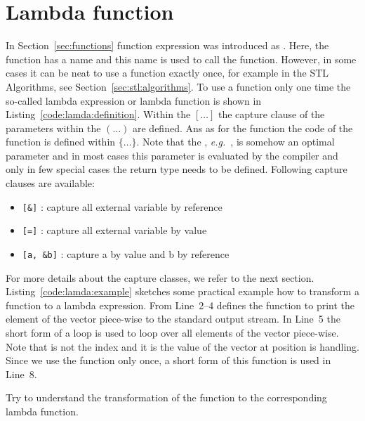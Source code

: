 \section{Lambda function}
\label{sec:lambda:function}
In Section~\ref{sec:functions} function expression was introduced as . Here, the function has a name  and this name is used to call the function. However, in some cases it can be neat to use a function exactly once, for example in the STL Algorithms, see Section~\ref{sec:stl:algorithms}. To use a function only one time the so-called lambda expression or lambda function is shown in Listing~\ref{code:lamda:definition}. Within the $[\ldots ]$ the capture clause of the parameters within the $(\ldots )$ are defined. Ans as for the function the code of the function is defined within $\{\dots \}$. Note that the , \emph{e.g.}\ , is somehow an optimal parameter and in most cases this parameter is evaluated by the compiler and only in few special cases the return type needs to be defined. Following capture clauses are available:
\begin{itemize}
\item  \lstinline|[&]| : capture all external variable by reference
\item  \lstinline|[=]| : capture all external variable by value
\item  \lstinline|[a, &b]| : capture a by value and b by reference
\end{itemize}
For more details about the capture classes, we refer to the next section.\\

Listing~\ref{code:lamda:example} sketches some practical example how to transform a function to a lambda expression. From Line~2--4 defines the function to print the element of the vector piece-wise to the standard output stream. In Line~5 the short form of a  loop is used to loop over all elements of the vector piece-wise. Note that  is not the index and it is the value of the vector at position  is handling. Since we use the function  only once, a short form of this function is used in Line~8. 

\begin{exercise}
Try to understand the transformation of the function  to the corresponding lambda function.
\end{exercise}

